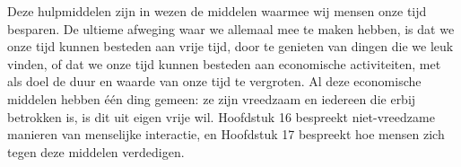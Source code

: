 Deze hulpmiddelen zijn in wezen de middelen waarmee wij mensen onze tijd besparen. De ultieme afweging waar we allemaal mee te maken hebben, is dat we onze tijd kunnen besteden aan vrije tijd, door te genieten van dingen die we leuk vinden, of dat we onze tijd kunnen besteden aan economische activiteiten, met als doel de duur en waarde van onze tijd te vergroten. Al deze economische middelen hebben één ding gemeen: ze zijn vreedzaam en iedereen die erbij betrokken is, is dit uit eigen vrije wil. Hoofdstuk 16 bespreekt niet-vreedzame manieren van menselijke interactie, en Hoofdstuk 17 bespreekt hoe mensen zich tegen deze middelen verdedigen.

